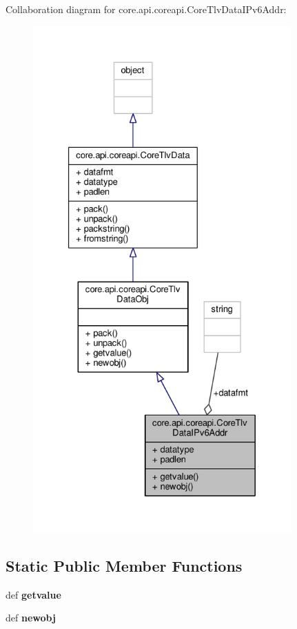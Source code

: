 Collaboration diagram for core.\+api.\+coreapi.\+Core\+Tlv\+Data\+I\+Pv6\+Addr\+:
\nopagebreak
\begin{figure}[H]
\begin{center}
\leavevmode
\includegraphics[height=550pt]{classcore_1_1api_1_1coreapi_1_1_core_tlv_data_i_pv6_addr__coll__graph}
\end{center}
\end{figure}
\subsection*{Static Public Member Functions}
\begin{DoxyCompactItemize}
\item 
\hypertarget{classcore_1_1api_1_1coreapi_1_1_core_tlv_data_i_pv6_addr_a47651e717c0dde52d7dbc4b761234aa2}{def {\bfseries getvalue}}\label{classcore_1_1api_1_1coreapi_1_1_core_tlv_data_i_pv6_addr_a47651e717c0dde52d7dbc4b761234aa2}

\item 
\hypertarget{classcore_1_1api_1_1coreapi_1_1_core_tlv_data_i_pv6_addr_a7047865dcd61667ec43da568ffb913d5}{def {\bfseries newobj}}\label{classcore_1_1api_1_1coreapi_1_1_core_tlv_data_i_pv6_addr_a7047865dcd61667ec43da568ffb913d5}

\end{DoxyCompactItemize}
